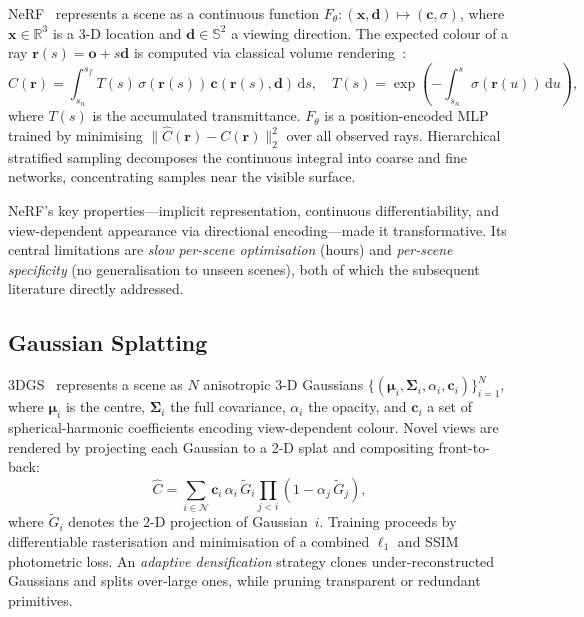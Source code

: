 NeRF~\citep{mildenhall2020nerf} represents a scene as a continuous function
$F_\theta:(\mathbf{x},\mathbf{d})\mapsto(\mathbf{c},\sigma)$, where
$\mathbf{x}\in\mathbb{R}^3$ is a 3-D location and
$\mathbf{d}\in\mathbb{S}^2$ a viewing direction.
The expected colour of a ray $\mathbf{r}(s)=\mathbf{o}+s\mathbf{d}$ is
computed via classical volume rendering~\citep{kajiya1984ray}:
\begin{equation}
  \hat{C}(\mathbf{r})=\int_{s_n}^{s_f} T(s)\,\sigma(\mathbf{r}(s))\,
  \mathbf{c}(\mathbf{r}(s),\mathbf{d})\,\mathrm{d}s,
  \quad T(s)=\exp\!\left(-\int_{s_n}^s\sigma(\mathbf{r}(u))\,\mathrm{d}u\right),
  \label{eq:volrender}
\end{equation}
where $T(s)$ is the accumulated transmittance.
$F_\theta$ is a position-encoded MLP~\citep{tancik2020fourier} trained by
minimising $\|\hat{C}(\mathbf{r})-C(\mathbf{r})\|_2^2$ over all observed rays.
Hierarchical stratified sampling decomposes the continuous integral into
coarse and fine networks, concentrating samples near the visible surface.

NeRF's key properties---implicit representation, continuous differentiability,
and view-dependent appearance via directional encoding---made it transformative.
Its central limitations are \emph{slow per-scene optimisation} (hours) and
\emph{per-scene specificity} (no generalisation to unseen scenes), both of which
the subsequent literature directly addressed.

\subsection{Gaussian Splatting}

3DGS~\citep{kerbl2023gaussian} represents a scene as $N$ anisotropic 3-D
Gaussians $\{(\boldsymbol{\mu}_i, \boldsymbol{\Sigma}_i, \alpha_i,
\mathbf{c}_i)\}_{i=1}^N$, where $\boldsymbol{\mu}_i$ is the centre,
$\boldsymbol{\Sigma}_i$ the full covariance, $\alpha_i$ the opacity, and
$\mathbf{c}_i$ a set of spherical-harmonic coefficients encoding
view-dependent colour.
Novel views are rendered by projecting each Gaussian to a 2-D splat and
compositing front-to-back:
\begin{equation}
  \hat{C}=\sum_{i\in\mathcal{N}}\mathbf{c}_i\,\alpha_i\,\tilde{G}_i
  \prod_{j<i}(1-\alpha_j\,\tilde{G}_j),
  \label{eq:splatting}
\end{equation}
where $\tilde{G}_i$ denotes the 2-D projection of Gaussian~$i$.
Training proceeds by differentiable rasterisation and minimisation of a
combined $\ell_1$ and SSIM photometric loss.
An \emph{adaptive densification} strategy clones under-reconstructed Gaussians
and splits over-large ones, while pruning transparent or redundant primitives.

